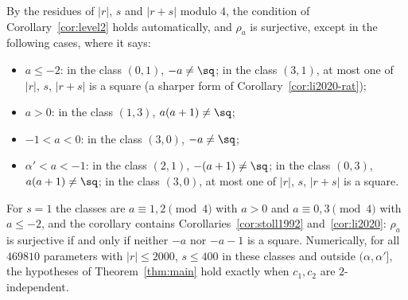 \begin{remark}
  \label{rem:level2-classes}
  By the residues of $|r|$, $s$ and $|r + s|$ modulo $4$, the condition of
  Corollary~\ref{cor:level2} holds automatically, and $\rho_a$ is surjective, except in the
  following cases, where it says:
  \begin{itemize}
    \item $a \le -2$: in the class $(0,1)$, $-a \ne \sq$; in the class $(3,1)$, at most one of
          $|r|$, $s$, $|r + s|$ is a square (a sharper form of Corollary~\ref{cor:li2020-rat});
    \item $a > 0$: in the class $(1,3)$, $a(a+1) \ne \sq$;
    \item $-1 < a < 0$: in the class $(3,0)$, $-a \ne \sq$;
    \item $\alpha' < a < -1$: in the class $(2,1)$, $-(a+1) \ne \sq$; in the class $(0,3)$,
          $a(a+1) \ne \sq$; in the class $(3,0)$, at most one of $|r|$, $s$, $|r + s|$ is a square.
  \end{itemize}
  For $s = 1$ the classes are $a \equiv 1, 2 \pmod 4$ with $a > 0$ and $a \equiv 0, 3 \pmod 4$
  with $a \le -2$, and the corollary contains Corollaries~\ref{cor:stoll1992}
  and~\ref{cor:li2020}: $\rho_a$ is surjective if and only if neither $-a$ nor $-a - 1$ is a
  square. Numerically, for all $469810$ parameters with $|r| \le 2000$, $s \le 400$ in these
  classes and outside $(\alpha, \alpha']$, the hypotheses of Theorem~\ref{thm:main} hold exactly when
  $c_1, c_2$ are $2$-independent.
\end{remark}

